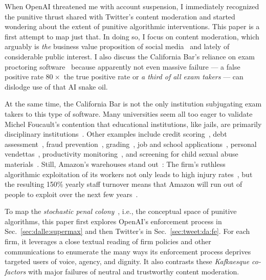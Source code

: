 When OpenAI threatened me with account suspension, I immediately recognized the
punitive thrust shared with Twitter's content moderation and started wondering
about the extent of punitive algorithmic interventions. This paper is a first
attempt to map just that. In doing so, I focus on content moderation, which
arguably is \emph{the} business value proposition of social
media~\cite{Masnick2022a,Patel2022a} and lately of considerable public interest.
I also discuss the California Bar's reliance on exam proctoring
software~\cite{FrancisWard2021b} because apparently not even massive failure ---
a false positive rate 80$\mspace{1mu}\times$ the true positive rate or \emph{a
third of all exam takers} --- can dislodge use of that AI snake oil.

At the same time, the California Bar is not the only institution subjugating
exam takers to this type of software. Many universities seem all too eager to
validate Michel Foucault's contention that educational institutions, like jails,
are primarily disciplinary institutions~\cite{Foucault1979}. Other examples
include credit scoring~\cite{Anonymous2018}, debt
assessment~\cite{Yampolskiy2015}, fraud prevention~\cite{Kugel2022},
grading~\cite{Lam2020}, job and school
applications~\cite{Anonymous2016,Hall2012,Hall2020a,Stockton2020}, personal
vendettas~\cite{Casovan2022}, productivity
monitoring~\cite{Covert2022,KantorSundaramea2022,Rosenblat2018}, and screening
for child sexual abuse materials~\cite{Atherton2022a}. Still, Amazon's
warehouses stand out~\cite{KantorWeiseea2021,Lennard2020}: The firm's ruthless
algorithmic exploitation of its workers not only leads to high injury
rates~\cite{Brown2019a,Clark2023,Sainato2021}, but the resulting 150\% yearly
staff turnover means that Amazon will run out of people to exploit over the next
few years~\cite{Sainato2022}.

To map the \emph{stochastic penal colony}~, i.e., the
conceptual space of punitive algorithms, this paper first explores OpenAI's
enforcement process in Sec.\ \ref{sec:dalle:supermax} and then Twitter's in
Sec.\ \ref{sec:tweet:da:fe}. For each firm, it leverages a close textual reading
of firm policies and other communications to enumerate the many ways its
enforcement process deprives targeted users of voice, agency, and dignity. It
also contrasts these \emph{Kafkaesque co-factors} with major failures of neutral
and trustworthy content moderation.

